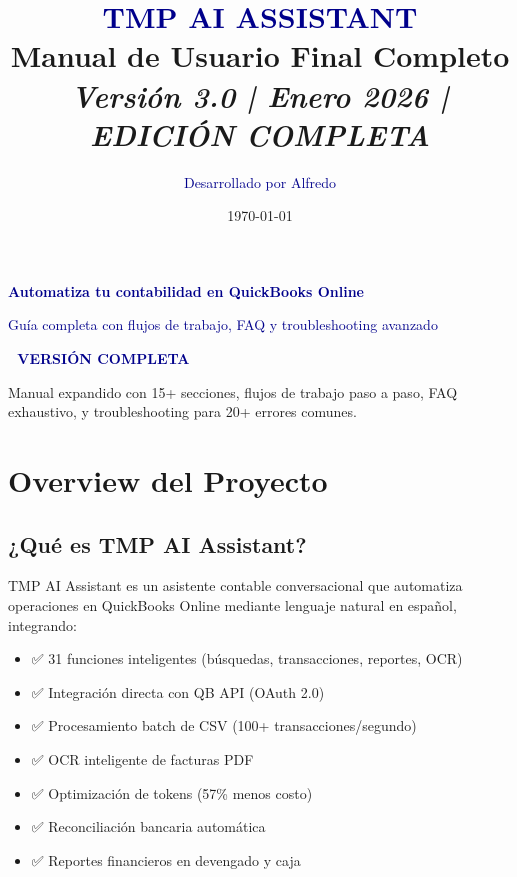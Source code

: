 \documentclass[12pt,oneside]{article}
\title{
    \Huge\bfseries\textcolor{darkblue}{TMP AI ASSISTANT}\\
    \Large\textcolor{accent}{Manual de Usuario Final Completo}\\
    \vspace{0.5cm}
    \large\textit{Versión 3.0 | Enero 2026 | EDICIÓN COMPLETA}
}
\author{\textcolor{darkblue}{Desarrollado por Alfredo}}
\date{\today}
\begin{document}
\maketitle
\thispagestyle{empty}

\begin{center}
    \vspace{1cm}
    \Large\textbf{\textcolor{darkblue}{Automatiza tu contabilidad en QuickBooks Online}}
    \vspace{0.5cm}
    
    \large\textcolor{darkblue}{Guía completa con flujos de trabajo, FAQ y troubleshooting avanzado}
    
    \vspace{2cm}
    \begin{tcolorbox}[colback=lightblue, colframe=darkblue, boxrule=2pt, width=0.95\textwidth]
        \textbf{\Large\textcolor{darkblue}{🚀 VERSIÓN COMPLETA}}
        
        Manual expandido con 15+ secciones, flujos de trabajo paso a paso, FAQ exhaustivo, y troubleshooting para 20+ errores comunes.
    \end{tcolorbox}
\end{center}

\newpage
\tableofcontents
\newpage

\section{Overview del Proyecto}

\subsection{¿Qué es TMP AI Assistant?}

TMP AI Assistant es un asistente contable conversacional que automatiza operaciones en QuickBooks Online mediante lenguaje natural en español, integrando:

\begin{itemize}
    \item ✅ 31 funciones inteligentes (búsquedas, transacciones, reportes, OCR)
    \item ✅ Integración directa con QB API (OAuth 2.0)
    \item ✅ Procesamiento batch de CSV (100+ transacciones/segundo)
    \item ✅ OCR inteligente de facturas PDF
    \item ✅ Optimización de tokens (57\% menos costo)
    \item ✅ Reconciliación bancaria automática
    \item ✅ Reportes financieros en devengado y caja
\end{itemize}
\end{document}
